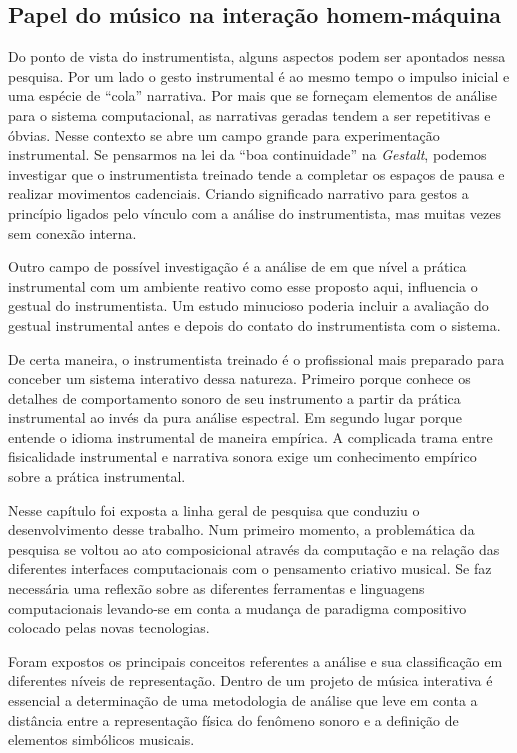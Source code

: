 \documentclass[draft]{ppgmus}
\begin{document}
\subsection{Papel do músico na interação homem-máquina}


Do ponto de vista do instrumentista, alguns aspectos podem ser apontados nessa pesquisa.
Por um lado o gesto instrumental é ao mesmo tempo o impulso inicial e uma espécie
de ``cola'' narrativa. Por mais que se forneçam elementos de análise para o sistema
computacional, as narrativas geradas tendem a ser repetitivas e óbvias. Nesse contexto
se abre um campo grande para experimentação instrumental. Se pensarmos na lei da ``boa continuidade''
na \textit{Gestalt}, podemos investigar que o instrumentista treinado tende a completar
os espaços de pausa e realizar movimentos cadenciais. Criando significado narrativo
para gestos a princípio ligados pelo vínculo com a análise do instrumentista, mas muitas
vezes sem conexão interna.

Outro campo de possível investigação é a análise de em que
nível a prática instrumental com um ambiente reativo como
esse proposto aqui, influencia o gestual do instrumentista.
Um estudo minucioso poderia incluir a avaliação do gestual
instrumental antes e depois do contato do instrumentista com 
o sistema.

De certa maneira, o instrumentista treinado é o profissional
mais preparado para conceber um sistema interativo dessa natureza.
Primeiro porque conhece os detalhes de comportamento sonoro de seu
instrumento a partir da prática instrumental ao invés da pura análise
espectral. Em segundo lugar porque entende o idioma instrumental
de maneira empírica. A complicada trama entre fisicalidade instrumental
e narrativa sonora exige um conhecimento empírico sobre a prática
instrumental.



Nesse capítulo foi exposta a linha geral de pesquisa que conduziu
o desenvolvimento desse trabalho.
Num primeiro momento, a problemática da pesquisa se voltou ao ato composicional
através da computação e na relação das diferentes interfaces computacionais
com o pensamento criativo musical. Se faz necessária uma reflexão sobre
as diferentes ferramentas e linguagens computacionais levando-se em conta
a mudança de paradigma compositivo colocado pelas novas tecnologias.

Foram expostos os principais conceitos referentes a análise e sua
classificação em diferentes níveis de representação.
Dentro de um projeto de música interativa é essencial a determinação de uma
metodologia de análise que leve em conta a distância entre a representação
física do fenômeno sonoro e a definição de elementos simbólicos musicais.
\end{document}
